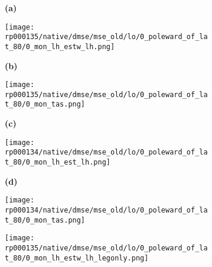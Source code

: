 \documentclass[preview]{standalone}
\begin{document}
\begin{figure}
  \begin{subfigure}[t]{0.05\textwidth}
    \textbf{\normalsize{(a)}}
  \end{subfigure}
  \begin{subfigure}[t]{0.45\textwidth}
    \texttt{[image: rp000135/native/dmse/mse\_old/lo/0\_poleward\_of\_lat\_80/0\_mon\_lh\_estw\_lh.png]}
  \end{subfigure}
  \begin{subfigure}[t]{0.05\textwidth}
    \textbf{\normalsize{(b)}}
  \end{subfigure}
  \begin{subfigure}[t]{0.45\textwidth}
    \texttt{[image: rp000135/native/dmse/mse\_old/lo/0\_poleward\_of\_lat\_80/0\_mon\_tas.png]}
  \end{subfigure}

  \begin{subfigure}[t]{0.05\textwidth}
    \textbf{\normalsize{(c)}}
  \end{subfigure}
  \begin{subfigure}[t]{0.45\textwidth}
    \texttt{[image: rp000134/native/dmse/mse\_old/lo/0\_poleward\_of\_lat\_80/0\_mon\_lh\_est\_lh.png]}
  \end{subfigure}
  \begin{subfigure}[t]{0.05\textwidth}
    \textbf{\normalsize{(d)}}
  \end{subfigure}
  \begin{subfigure}[t]{0.45\textwidth}
    \texttt{[image: rp000134/native/dmse/mse\_old/lo/0\_poleward\_of\_lat\_80/0\_mon\_tas.png]}
  \end{subfigure}


  \begin{subfigure}[t]{0.56\textwidth}
    \texttt{[image: rp000135/native/dmse/mse\_old/lo/0\_poleward\_of\_lat\_80/0\_mon\_lh\_estw\_lh\_legonly.png]}
  \end{subfigure}


\end{figure}
\end{document}
